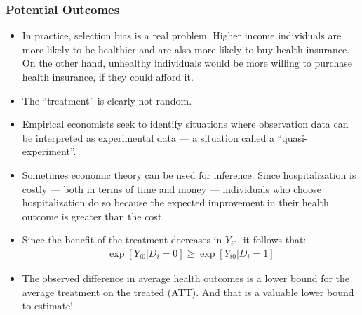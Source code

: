 \begin{frame}
\frametitle{Potential Outcomes}
\begin{itemize}
\item In practice, selection bias is a real problem. Higher income individuals are more likely to be healthier and are also more likely to buy health insurance. On the other hand, unhealthy individuals would be more willing to purchase health insurance, if they could afford it. 
\item The ``treatment'' is clearly not random. 
\item Empirical economists seek to identify situations where observation data can be interpreted as experimental data --- a situation called a ``quasi-experiment''.
\item Sometimes economic theory can be used for inference. Since hospitalization is costly --- both in terms of time and money --- individuals who choose hospitalization do so because the expected improvement in their health outcome is greater than the cost. 
\item Since the benefit of the treatment decreases in $Y_{i0}$, it follows that: 
\begin{align*}
\exp[Y_{i0}|D_i=0] \geq \exp[Y_{i0} | D_i = 1]
\end{align*}
\item The observed difference in average health outcomes is a lower bound for the average treatment on the treated (ATT). And that is a valuable lower bound to estimate!
\end{itemize}
\end{frame}


